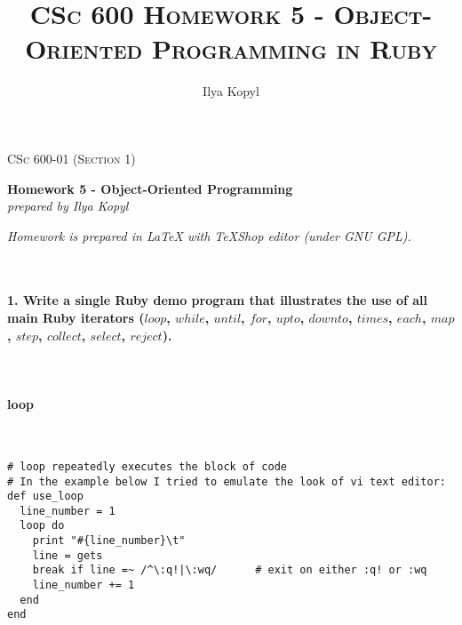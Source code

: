 \documentclass{article}
\author{Ilya Kopyl}
\begin{document}
	\setlength{\grammarparsep}{5pt plus 1pt minus 1pt} %
	\setlength{\grammarindent}{13em} %




	\begin{titlepage}
		\begin{center}
				\Large\textsc{CSc 600-01 (Section 1)}
				
				\Large\textbf{Homework 5 - Object-Oriented Programming}\\

				\Large\textit{prepared by Ilya Kopyl}
				
		\end{center}	
	\end{titlepage}


	\title{\textsc{CSc 600 Homework 5 - Object-Oriented Programming in Ruby}}	
	\maketitle
	
		\noindent \textit{Homework is prepared in LaTeX with TeXShop editor (under GNU GPL).}

	\rmfamily\




	\paragraph{1. Write a single Ruby demo program that illustrates the use of all main Ruby iterators (\(loop\), \(while\), \(until\), \(for\), \(upto\), \(downto\), \(times\), \(each\), \(map\), \(step\), \(collect\), \(select\), \(reject\)).}\

\paragraph{ loop}\

\begin{verbatim}
# loop repeatedly executes the block of code
# In the example below I tried to emulate the look of vi text editor:
def use_loop
  line_number = 1
  loop do
    print "#{line_number}\t"
    line = gets
    break if line =~ /^\:q!|\:wq/      # exit on either :q! or :wq
    line_number += 1
  end
end
\end{verbatim}
\end{document}
